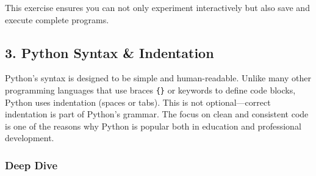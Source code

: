 \documentclass[
  letterpaper,
  DIV=11,
  numbers=noendperiod]{scrreprt}
\begin{document}
This exercise ensures you can not only experiment interactively but also
save and execute complete programs.

\subsection{3. Python Syntax \&
Indentation}\label{python-syntax-indentation}

Python's syntax is designed to be simple and human-readable. Unlike many
other programming languages that use braces \texttt{\{\}} or keywords to
define code blocks, Python uses indentation (spaces or tabs). This is
not optional---correct indentation is part of Python's grammar. The
focus on clean and consistent code is one of the reasons why Python is
popular both in education and professional development.

\subsubsection{Deep Dive}\label{deep-dive-2}
\end{document}

